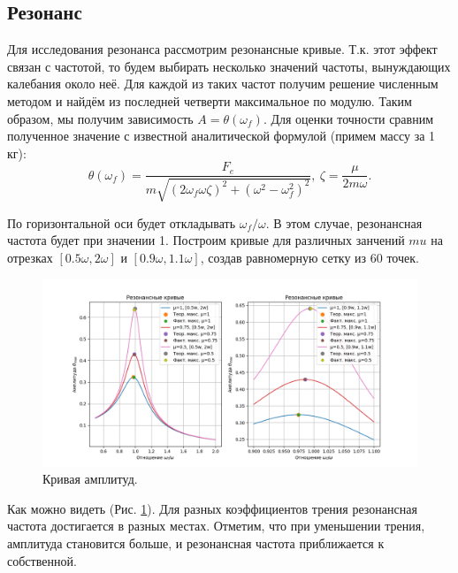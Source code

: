 \subsection*{Резонанс}
Для исследования резонанса рассмотрим резонансные кривые. Т.к. этот эффект связан с частотой, то будем выбирать несколько значений частоты, вынуждающих калебания около неё. Для каждой из таких частот получим решение численным методом и найдём из последней четверти максимальное по модулю. Таким образом, мы получим зависимость $A=\theta(\omega_f)$. Для оценки точности сравним полученное значение с известной аналитической формулой (примем массу за 1 кг):
\begin{equation}
	\theta(\omega_f) = \frac{F_e}{m \sqrt{(2\omega_f \omega \zeta)^2 + (\omega ^ 2 - \omega_f^2)^2}}, \ \zeta = \frac{\mu}{2m\omega}.
\end{equation}

По горизонтальной оси будет откладывать $\omega_f / \omega$. В этом случае, резонансная частота будет при значении 1. Построим кривые для различных занчений $mu$ на отрезках $[0.5\omega, 2\omega]$ и $[0.9\omega, 1.1\omega]$, создав равномерную сетку из 60 точек.

\begin{figure}[h]  %
	\centering
	\includegraphics[width=1\textwidth]{imgs/res.png}  %
	\caption{Кривая амплитуд.}  %
	\label{fig:res}  %
\end{figure}

Как можно видеть (Рис. \ref{fig:res}). Для разных коэффициентов трения резонансная частота достигается в разных местах. Отметим, что при уменьшении трения, амплитуда становится больше, и резонансная частота приближается к собственной. 



